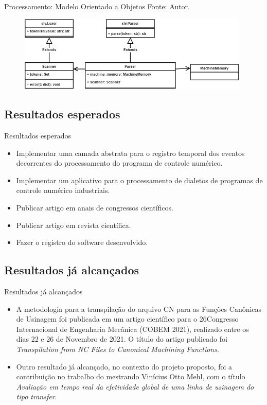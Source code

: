 \documentclass[aspectratio=169]{beamer}
\begin{document}
{\begin{frame}{Processamento: Modelo Orientado a Objetos}
  Fonte: Autor.
  \begin{figure}[H]
    \centering
    \includegraphics[width=11.0cm]{ncparser-class-canonical-parser.png}
  \end{figure}
\end{frame}


\subsection{Resultados esperados}
\begin{frame}{Resultados esperados}
  \begin{itemize}
    \item Implementar uma camada abstrata para o registro temporal dos eventos decorrentes do 
    processamento do programa de controle num\'erico.
    \item Implementar um aplicativo para o processamento de dialetos de programas de controle 
    num\'erico industriais.
    \item Publicar artigo em anais de congressos cient\'ificos.
    \item Publicar artigo em revista cient\'ifica.
    \item Fazer o registro do software desenvolvido.
  \end{itemize}
\end{frame}


\subsection{Resultados já alcançados}
\begin{frame}{Resultados já alcançados}
  \begin{itemize}
    \item {
      A metodologia para a transpila\c c\~ao do arquivo CN para as Fun\c c\~oes Can\^onicas de Usinagem 
      foi publicada em um artigo cient\'ifico para o 26\textordmasculine Congresso Internacional de 
      Engenharia Mec\^anica (COBEM 2021), realizado entre os dias 22 e 26 de Novembro de 2021.
      O t\'itulo do artigo publicado foi \emph{Transpilation from NC Files to Canonical 
      Machining Functions}.
    }
    \item {
      Outro resultado j\'a alcan\c cado, no contexto do projeto proposto, foi a contribui\c c\~ao no 
      trabalho do mestrando Vin\'icius Otto Mehl, com o t\'itulo 
      \emph{Avalia\c c\~ao em tempo real da efetividade global de uma linha de usinagem do tipo transfer}.
    }
  \end{itemize}
\end{frame}


}
\end{document}
